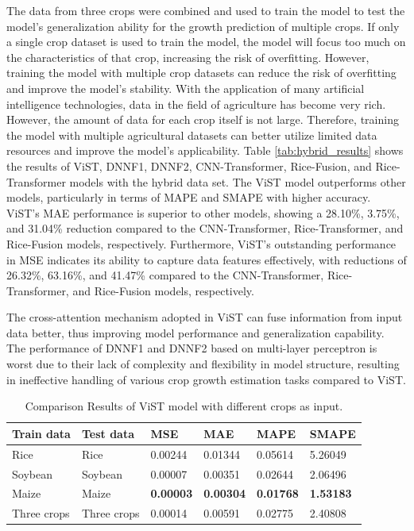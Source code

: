 \documentclass[acmsmall, screen]{acmart}
\begin{document}
The data from three crops were combined and used to train the model to test the model's generalization ability for the growth prediction of multiple crops. If only a single crop dataset is used to train the model, the model will focus too much on the characteristics of that crop, increasing the risk of overfitting. However, training the model with multiple crop datasets can reduce the risk of overfitting and improve the model's stability. With the application of many artificial intelligence technologies, data in the field of agriculture has become very rich. However, the amount of data for each crop itself is not large. Therefore, training the model with multiple agricultural datasets can better utilize limited data resources and improve the model's applicability. Table \ref{tab:hybrid_results} shows the results of ViST, DNNF1, DNNF2, CNN-Transformer, Rice-Fusion, and Rice-Transformer models with the hybrid data set. The ViST model outperforms other models, particularly in terms of MAPE and SMAPE with higher accuracy. ViST's MAE performance is superior to other models, showing a 28.10\%, 3.75\%, and 31.04\% reduction compared to the CNN-Transformer, Rice-Transformer, and Rice-Fusion models, respectively. Furthermore, ViST's outstanding performance in MSE indicates its ability to capture data features effectively, with reductions of 26.32\%, 63.16\%, and 41.47\% compared to the CNN-Transformer, Rice-Transformer, and Rice-Fusion models, respectively.

The cross-attention mechanism adopted in ViST can fuse information from input data better, thus improving model performance and generalization capability. The performance of DNNF1 and DNNF2 based on multi-layer perceptron is worst due to their lack of complexity and flexibility in model structure, resulting in ineffective handling of various crop growth estimation tasks compared to ViST.

\begin{table}[htbp]
  \centering
  \caption{Comparison Results of ViST model with different crops as input.}
    \begin{tabular}{llllll}
    \toprule
    Train data & \multicolumn{1}{l}{Test data} & \multicolumn{1}{l}{MSE} & \multicolumn{1}{l}{MAE} & \multicolumn{1}{l}{MAPE} & \multicolumn{1}{l}{SMAPE} \\
    \midrule
    Rice  & Rice  & 0.00244 & 0.01344 & 0.05614 & 5.26049 \\
    Soybean & Soybean & 0.00007 & 0.00351 & 0.02644 & 2.06496 \\
    Maize & Maize & \textbf{0.00003} & \textbf{0.00304} & \textbf{0.01768} & \textbf{1.53183} \\
    Three crops & Three crops & 0.00014 & 0.00591 & 0.02775 & 2.40808 \\
    \bottomrule
    \end{tabular}%
  \label{tab:ubiquitous}%
\end{table}%
\end{document}
